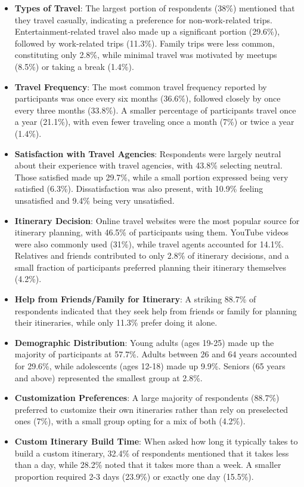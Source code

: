 \documentclass[sigconf,authordraft]{acmart}
\begin{document}
\begin{itemize}
    \item \textbf{Types of Travel}: The largest portion of respondents (38\%) mentioned that they travel casually, indicating a preference for non-work-related trips. Entertainment-related travel also made up a significant portion (29.6\%), followed by work-related trips (11.3\%). Family trips were less common, constituting only 2.8\%, while minimal travel was motivated by meetups (8.5\%) or taking a break (1.4\%).

    \item \textbf{Travel Frequency}: The most common travel frequency reported by participants was once every six months (36.6\%), followed closely by once every three months (33.8\%). A smaller percentage of participants travel once a year (21.1\%), with even fewer traveling once a month (7\%) or twice a year (1.4\%).

    \item \textbf{Satisfaction with Travel Agencies}: Respondents were largely neutral about their experience with travel agencies, with 43.8\% selecting neutral. Those satisfied made up 29.7\%, while a small portion expressed being very satisfied (6.3\%). Dissatisfaction was also present, with 10.9\% feeling unsatisfied and 9.4\% being very unsatisfied.

    \item \textbf{Itinerary Decision}: Online travel websites were the most popular source for itinerary planning, with 46.5\% of participants using them. YouTube videos were also commonly used (31\%), while travel agents accounted for 14.1\%. Relatives and friends contributed to only 2.8\% of itinerary decisions, and a small fraction of participants preferred planning their itinerary themselves (4.2\%).

    \item \textbf{Help from Friends/Family for Itinerary}: A striking 88.7\% of respondents indicated that they seek help from friends or family for planning their itineraries, while only 11.3\% prefer doing it alone.

    \item \textbf{Demographic Distribution}: Young adults (ages 19-25) made up the majority of participants at 57.7\%. Adults between 26 and 64 years accounted for 29.6\%, while adolescents (ages 12-18) made up 9.9\%. Seniors (65 years and above) represented the smallest group at 2.8\%.

    \item \textbf{Customization Preferences}: A large majority of respondents (88.7\%) preferred to customize their own itineraries rather than rely on preselected ones (7\%), with a small group opting for a mix of both (4.2\%).

    \item \textbf{Custom Itinerary Build Time}: When asked how long it typically takes to build a custom itinerary, 32.4\% of respondents mentioned that it takes less than a day, while 28.2\% noted that it takes more than a week. A smaller proportion required 2-3 days (23.9\%) or exactly one day (15.5\%).
\end{itemize}
\end{document}
